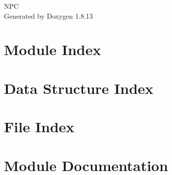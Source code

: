 \documentclass[twoside]{book}
\newcommand{\+}{\discretionary{\mbox{\scriptsize$\hookleftarrow$}}{}{}}
\newcommand{\clearemptydoublepage}{%
  \newpage{\pagestyle{empty}\cleardoublepage}%
}
\begin{document}
\hypersetup{pageanchor=false,
             bookmarksnumbered=true,
             pdfencoding=unicode
            }
\begin{titlepage}
\vspace*{7cm}
\begin{center}%
{\Large N\+PC }\\
\vspace*{1cm}
{\large Generated by Doxygen 1.8.13}\\
\end{center}
\end{titlepage}
\clearemptydoublepage
{}
\tableofcontents
\clearemptydoublepage
{}
\hypersetup{pageanchor=true}

\chapter{Module Index}

\chapter{Data Structure Index}

\chapter{File Index}

\chapter{Module Documentation}






































\end{document}
